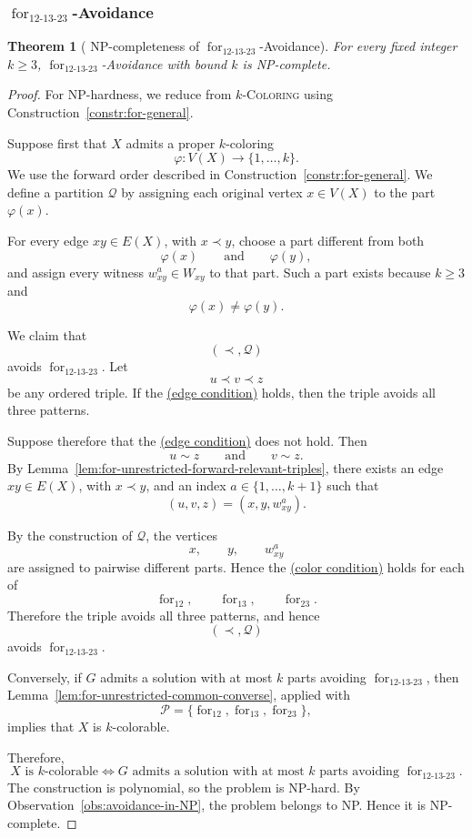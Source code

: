 \documentclass[12pt]{article}
\theoremstyle{plain}
\newtheorem{theorem}{Theorem}[section]
\theoremstyle{definition}
\theoremstyle{remark}
\theoremstyle{definition}
\newcommand{\edgecondition}{%
  \hyperref[def:avoid:cond:edge]{(edge condition)}\xspace
}
\newcommand{\colorcondition}{%
  \hyperref[def:avoid:cond:color]{(color condition)}\xspace
}
\newcommand{\forlabel}{\mathrm{for}}
\DeclareRobustCommand{\forparam}[1]{%
  \ensuremath{\mathop{\forlabel}\nolimits_{#1}}%
}
\begin{document}
\subsubsection{
\texorpdfstring{\(\forparam{12\text{-}13\text{-}23}\)-Avoidance}
{for12-13-23-Avoidance}
}
\label{subsubsec:for12-13-23-avoidance}




\begin{theorem}[
NP-completeness of
\texorpdfstring{\(\forparam{12\text{-}13\text{-}23}\)-Avoidance}
{for12-13-23-Avoidance}
]
\label{thm:for12-13-23-np-complete}
For every fixed integer \(k\ge 3\),
\(\forparam{12\text{-}13\text{-}23}\)-Avoidance with bound \(k\)
is NP-complete.
\end{theorem}

\begin{proof}
For NP-hardness, we reduce from \(k\)-\textsc{Coloring} using
Construction~\ref{constr:for-general}.

Suppose first that \(X\) admits a proper \(k\)-coloring
\[
\varphi:V(X)\to\{1,\dots,k\}.
\]
We use the forward order described in
Construction~\ref{constr:for-general}. We define a partition
\(\mathcal Q\) by assigning each original vertex \(x\in V(X)\) to the
part \(\varphi(x)\).

For every edge \(xy\in E(X)\), with \(x\prec y\), choose a part
different from both
\[
\varphi(x)
\qquad\text{and}\qquad
\varphi(y),
\]
and assign every witness \(w^a_{xy}\in W_{xy}\) to that part.
Such a part exists because \(k\ge 3\) and
\[
\varphi(x)\neq\varphi(y).
\]

We claim that
\[
(\prec,\mathcal Q)
\]
avoids \(\forparam{12\text{-}13\text{-}23}\). Let
\[
u\prec v\prec z
\]
be any ordered triple. If the \edgecondition{} holds, then the triple
avoids all three patterns.

Suppose therefore that the \edgecondition{} does not hold. Then
\[
u\sim z
\qquad\text{and}\qquad
v\sim z.
\]
By Lemma~\ref{lem:for-unrestricted-forward-relevant-triples}, there
exists an edge \(xy\in E(X)\), with \(x\prec y\), and an index
\(a\in\{1,\dots,k+1\}\) such that
\[
(u,v,z)=(x,y,w^a_{xy}).
\]

By the construction of \(\mathcal Q\), the vertices
\[
x,\qquad y,\qquad w^a_{xy}
\]
are assigned to pairwise different parts. Hence the
\colorcondition{} holds for each of
\[
\forparam{12},\qquad
\forparam{13},\qquad
\forparam{23}.
\]
Therefore the triple avoids all three patterns, and hence
\[
(\prec,\mathcal Q)
\]
avoids \(\forparam{12\text{-}13\text{-}23}\).

Conversely, if \(G\) admits a solution with at most \(k\) parts
avoiding \(\forparam{12\text{-}13\text{-}23}\), then
Lemma~\ref{lem:for-unrestricted-common-converse}, applied with
\[
\mathcal P=
\{\forparam{12},\forparam{13},\forparam{23}\},
\]
implies that \(X\) is \(k\)-colorable.

Therefore,
\[
X\text{ is \(k\)-colorable}
\iff
G\text{ admits a solution with at most \(k\) parts avoiding }
\forparam{12\text{-}13\text{-}23}.
\]
The construction is polynomial, so the problem is NP-hard.
By Observation~\ref{obs:avoidance-in-NP}, the problem belongs to NP.
Hence it is NP-complete.
\end{proof}
\end{document}

